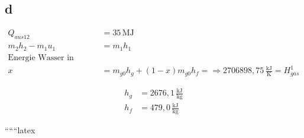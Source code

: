\subsection*{d}

\begin{align*}
Q_{aus12} &= 35 \, \text{MJ} \\
m_2 h_2 - m_1 u_1 &= m_1 h_1 \\
\text{Energie Wasser in Kessel Zustand 1} \\
x &= m_{g0} h_g + (1 - x) m_{g0} h_f = \Rightarrow 2706898,75 \, \frac{\text{kJ}}{\text{K}} = H_{gas}^1
\end{align*}

\begin{align*}
h_g &= 2676,1 \, \frac{\text{kJ}}{\text{kg}} \\
h_f &= 479,0 \, \frac{\text{kJ}}{\text{kg}}
\end{align*}

``````latex



